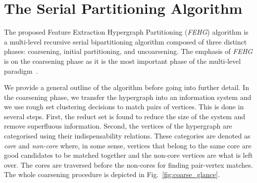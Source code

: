 \documentclass[twocolumn]{svjour3}          \smartqed
\begin{document}
\section{The Serial Partitioning Algorithm}\label{sec:fehg_alg}


The proposed Feature Extraction Hypergraph Partitioning (\textit{FEHG}) algorithm is a multi-level recursive serial bipartitioning algorithm composed of three distinct phases: coarsening, initial partitioning, and uncoarsening. The emphasis of \textit{FEHG }is on the coarsening phase as it is the most important phase of the multi-level paradigm~\cite{karytech2002}. 

We provide a general outline of the algorithm before going into further detail. In the coarsening phase, we transfer the hypergraph into an information system and we use rough set clustering decisions to match pairs of vertices. This is done in several steps. First, the reduct set is found to reduce the size of the system and remove superfluous information. Second, the vertices of the hypergraph are categorised using their indispensability relations. These categories are denoted as \textit{core} and \textit{non-core} where, in some sense, vertices that belong to the same core are good candidates to be matched together and the non-core vertices are what is left over. The cores are traversed before the non-cores for finding pair-vertex matches. The whole coarsening procedure is depicted in Fig.~\ref{fig:coarse_glance}.
\end{document}
